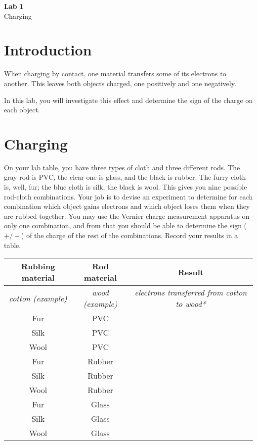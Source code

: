 \documentclass{article}
\begin{document}
\fancyfoot[C]{\thepage}
\vspace*{0cm}
\begin{center}
	{\LARGE \textbf{Lab 1}}\\
	\vspace{.25cm}
	{\Large Charging}
\end{center}

\section*{Introduction}
When charging by contact, one material transfers some of its electrons to another. This leaves both objects charged, one positively and one negatively. 

In this lab, you will investigate this effect and determine the sign of the charge on each object.

\section*{Charging}
On your lab table, you have three types of cloth and three different rods. The gray rod is PVC, the clear one is glass, and the black is rubber. The furry cloth is, well, fur; the blue cloth is silk; the black is wool. This gives you nine possible rod-cloth combinations. Your job is to devise an experiment to determine for each combination which object gains electrons and which object loses them when they are rubbed together. You may use the Vernier charge measurement apparatus on only one combination, and from that you should be able to determine the sign ($+/-$) of the charge of the rest of the combinations. Record your results in a table.

\begin{table}[ht!]
	\centering
	\begin{tabular}{|c|c|c|}
		\hline
		\textbf{Rubbing material} & \textbf{Rod material} & \textbf{Result} \\
		\hline
		\textit{cotton (example)} & \textit{wood (example)} & \textit{electrons transferred from cotton to wood*}\\
		\hline
		Fur & PVC & \\
		\hline
		Silk & PVC & \\
		\hline
		Wool & PVC & \\
		\hline
		Fur & Rubber & \\
		\hline
		Silk & Rubber & \\
		\hline
		Wool & Rubber & \\
		\hline
		Fur & Glass & \\
		\hline
		Silk & Glass & \\
		\hline
		Wool & Glass & \\
		\hline
	\end{tabular}
\end{table}
\end{document}
